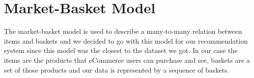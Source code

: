 \section{Market-Basket Model}
\label{basket}

The market-basket model is used to describe a many-to-many relation between items and baskets and
we decided to go with this model for our recommendation system since this model was the closest to
the dataset we got.
In our case the items are the products that eCommerce users can purchase and see,
baskets are a set of those products and our data is represented by a sequence of baskets.

